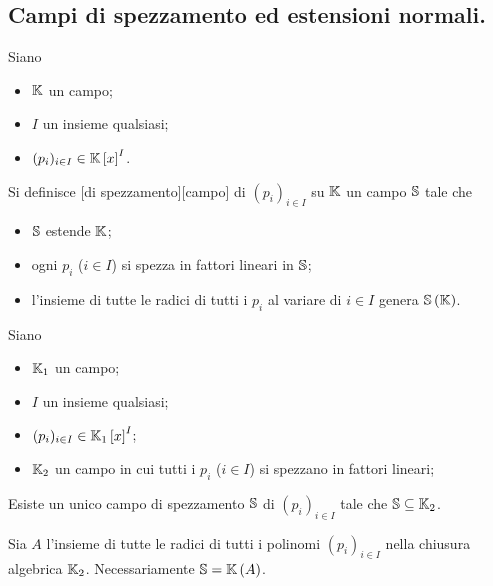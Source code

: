 \subsection{Campi di spezzamento ed estensioni normali.}\label{CampiDiSpezzamento}
\begin{Definition}
	Siano
	\begin{itemize}
		\item $\mathbb{K}$ un campo;
		\item $I$ un insieme qualsiasi;
		\item $(p_i)_{i \in I} \in \mathbb{K} \left [ x \right ]^I$.
	\end{itemize}
	Si definisce [di spezzamento][campo] di $(p_i)_{i \in I}$ su $\mathbb{K}$ un campo $\mathbb{S}$ tale che
	\begin{itemize}
		\item $\mathbb{S}$ estende $\mathbb{K}$;
		\item ogni $p_i$ ($i \in I$) si spezza in fattori lineari in $\mathbb{S}$;
		\item l'insieme di tutte le radici di tutti i $p_i$ al variare di $i \in I$ genera $\mathbb{S} \left ( \mathbb{K} \right )$.
	\end{itemize}
\end{Definition}
\begin{Theorem}
	Siano
	\begin{itemize}
		\item $\mathbb{K}_1$ un campo;
		\item $I$ un insieme qualsiasi;
		\item $(p_i)_{i \in I} \in \mathbb{K}_1 \left [ x \right ]^I$;
		\item $\mathbb{K}_2$ un campo in cui tutti i $p_i$ ($i \in I$) si spezzano in fattori lineari;
	\end{itemize}
	Esiste un unico campo di spezzamento $\mathbb{S}$ di $(p_i)_{i \in I}$ tale che $\mathbb{S} \subseteq \mathbb{K}_2$.
\end{Theorem}
\Proof Sia $A$ l'insieme di tutte le radici di tutti i polinomi $(p_i)_{i \in I}$ nella chiusura algebrica $\mathbb{K}_2$. Necessariamente $\mathbb{S} = \mathbb{K} \left ( A \right )$. \EndProof
